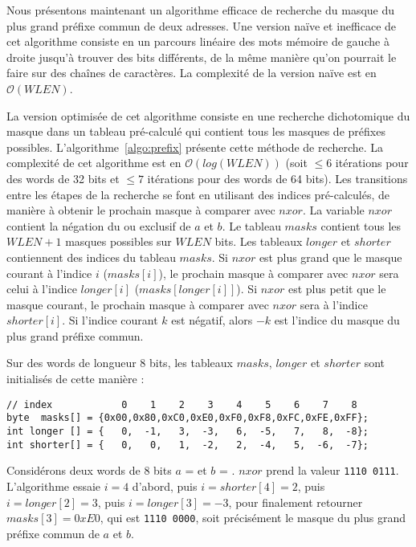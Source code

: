 Nous présentons maintenant un algorithme efficace de recherche du masque du plus
grand préfixe commun de deux adresses.
Une version na\"ive et inefficace de cet algorithme consiste en un parcours
linéaire des mots mémoire de gauche à droite jusqu'à trouver des bits
différents, de la même manière qu'on pourrait le faire sur des chaînes de
caractères.
La complexité de la version na\"ive est en $\mathcal{O}(\mathit{WLEN})$.

La version optimisée de cet algorithme consiste en une recherche
dichotomique du masque dans un tableau pré-calculé qui contient tous les masques
de préfixes possibles.
L'algorithme~\ref{algo:prefix} présente cette méthode de recherche.
La complexité de cet algorithme est en
$\mathcal{O}(\mathit{log}(\mathit{WLEN}))$ (soit $\le 6$ itérations pour des
words de 32 bits et $\le 7$ itérations pour des words de 64 bits).
Les transitions entre les étapes de la recherche se font en utilisant des
indices pré-calculés, de manière à obtenir le prochain masque à comparer avec
$nxor$.
La variable $nxor$ contient la négation du ou exclusif de $a$ et $b$.
Le tableau $masks$ contient tous les $WLEN+1$ masques possibles sur
$WLEN$ bits.
Les tableaux $longer$ et $shorter$ contiennent des indices du tableau $masks$.
Si $nxor$ est plus grand que le masque courant à l'indice $i$ ($masks[i]$), le
prochain masque à comparer avec $nxor$ sera celui à l'indice $longer[i]$
($masks[longer[i]]$).
Si $nxor$ est plus petit que le masque courant, le prochain masque à comparer
avec $nxor$ sera à l'indice $shorter[i]$.
Si l'indice courant $k$ est négatif, alors $- k$ est l'indice du masque
du plus grand préfixe commun.

Sur des words de longueur 8 bits, les tableaux $masks$, $longer$ et $shorter$
sont initialisés de cette manière :

\begin{lstlisting}
// index            0    1    2    3    4    5    6    7    8
byte  masks[] = {0x00,0x80,0xC0,0xE0,0xF0,0xF8,0xFC,0xFE,0xFF};
int longer [] = {   0,  -1,   3,  -3,   6,  -5,   7,   8,  -8};
int shorter[] = {   0,   0,   1,  -2,   2,  -4,   5,  -6,  -7};
\end{lstlisting}

Considérons deux words de 8 bits $a$ =  et
$b$ = .
$nxor$ prend la valeur \texttt{1110\,0111}.
L'algorithme essaie $i = 4$ d'abord, puis $i = shorter[4] = 2$, puis
$i = longer[2] = 3$, puis $i = longer[3] = -3$, pour finalement retourner
$masks[3] = 0xE0$, qui est \texttt{1110\,0000}, soit précisément le masque du
plus grand préfixe commun de $a$ et $b$.


